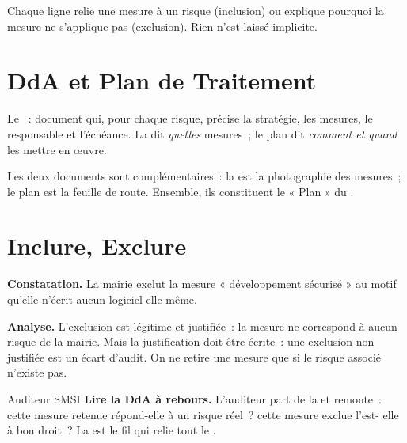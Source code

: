 Chaque ligne relie une mesure à un risque (inclusion) ou explique pourquoi la
mesure ne s'applique pas (exclusion). Rien n'est laissé implicite.

\section{DdA et Plan de Traitement}
\label{sec:c14-plan}

\begin{boxdef}
Le ~: document qui, pour chaque risque,
précise la stratégie, les mesures, le responsable et l'échéance. La 
dit \emph{quelles} mesures~; le plan dit \emph{comment et quand} les mettre en
\oe uvre.
\end{boxdef}

Les deux documents sont complémentaires~: la  est la photographie
des mesures~; le plan est la feuille de route. Ensemble, ils constituent le
« Plan » du .

\section{Inclure, Exclure}
\label{sec:c14-justifier}

\begin{boxprocedure}
\textbf{Constatation.} La mairie exclut la mesure « développement sécurisé » au
motif qu'elle n'écrit aucun logiciel elle-même.

\medskip
\textbf{Analyse.} L'exclusion est légitime et justifiée~: la mesure ne
correspond à aucun risque de la mairie. Mais la justification doit être écrite~:
une exclusion non justifiée est un écart d'audit. On ne retire une mesure que
si le risque associé n'existe pas.
\end{boxprocedure}

\begin{boxmetier}{Auditeur SMSI}
\textbf{Lire la DdA à rebours.} L'auditeur part de la  et remonte~:
cette mesure retenue répond-elle à un risque réel~? cette mesure exclue l'est-
elle à bon droit~? La  est le fil qui relie tout le .
\end{boxmetier}

